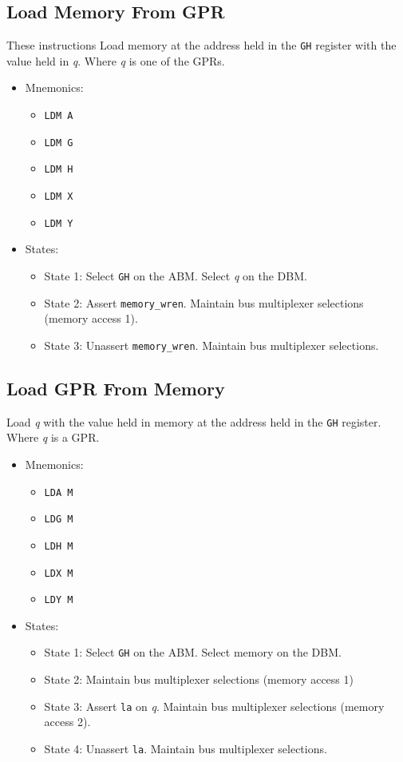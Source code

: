 \documentclass[a4paper,12pt]{article}
\newcommand{\Gr}{\texttt{G}}
\newcommand{\Hr}{\texttt{H}}
\newcommand{\qq}{\textit{q}}
\begin{document}
\subsection{Load Memory From GPR}
These instructions Load memory at the address held in the \Gr{}\Hr{} register
with the value held in \qq{}. Where \qq{} is one of the GPRs.
\par

\begin{itemize}
\item Mnemonics:
\begin{itemize}
	\item \texttt{LDM A}
	\item \texttt{LDM G}
	\item \texttt{LDM H}
	\item \texttt{LDM X}
	\item \texttt{LDM Y}
\end{itemize}
\item States:
\begin{itemize}
	\item State 1: Select \Gr{}\Hr{} on the ABM. Select \qq{} on the DBM.
	\item State 2: Assert \texttt{memory\_wren}. Maintain bus multiplexer 
	selections (memory access 1).
	\item State 3: Unassert \texttt{memory\_wren}. Maintain bus multiplexer
	selections.
\end{itemize}
\end{itemize}

\subsection{Load GPR From Memory}
Load \qq{} with the value held in memory at the address held in the \Gr{}\Hr{}
register. Where \qq{} is a GPR.
\par

\begin{itemize}
\item Mnemonics:
\begin{itemize}
	\item \texttt{LDA M}
	\item \texttt{LDG M}
	\item \texttt{LDH M}
	\item \texttt{LDX M}
	\item \texttt{LDY M}
\end{itemize}
\item States:
\begin{itemize}
	\item State 1: Select \Gr{}\Hr{} on the ABM. Select memory on the DBM.
	\item State 2: Maintain bus multiplexer selections (memory access 1)
	\item State 3: Assert \texttt{la} on \qq{}. Maintain bus multiplexer
	selections (memory access 2).
	\item State 4: Unassert \texttt{la}. Maintain bus multiplexer 
	selections.
\end{itemize}
\end{itemize}
\end{document}
